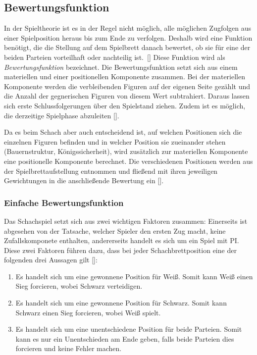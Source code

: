 \subsection{Bewertungsfunktion}

In der Spieltheorie ist es in der Regel nicht möglich, alle möglichen Zugfolgen aus einer Spielposition heraus bis zum Ende zu verfolgen.
Deshalb \glqq [...] wird eine Funktion benötigt, die die Stellung auf dem Spielbrett danach bewertet,
ob sie für eine der beiden Parteien vorteilhaft oder nachteilig ist.\grqq \ [\cite{Paulsen2009}]
Diese Funktion wird als \textit{Bewertungsfunktion} bezeichnet.
Die Bewertungsfunktion setzt sich aus einem materiellen und einer positionellen Komponente zusammen.
Bei der materiellen Komponente werden die verbleibenden Figuren auf der eigenen Seite gezählt und die Anzahl der gegnerischen Figuren von diesem Wert subtrahiert.
Daraus lassen sich erste Schlussfolgerungen über den Spielstand ziehen.
Zudem ist es möglich, die derzeitige Spielphase abzuleiten [\cite{Paulsen2009}].

Da es beim Schach aber auch entscheidend ist, auf welchen Positionen sich die einzelnen Figuren befinden und in welcher Position sie zueinander stehen (Bauernstruktur, Königssicherheit), wird zusätzlich zur materiellen Komponente eine positionelle Komponente berechnet.
Die verschiedenen Positionen werden aus der Spielbrettaufstellung entnommen und fließend mit ihren jeweiligen Gewichtungen in die anschließende Bewertung ein [\cite{Paulsen2009}].


\subsubsection{Einfache Bewertungsfunktion}

Das Schachspiel setzt sich aus zwei wichtigen Faktoren zusammen: Einerseits ist abgesehen von der Tatsache, welcher Spieler den ersten Zug macht, keine Zufallskomponete enthalten, andererseits handelt es sich um ein Spiel mit \gls{PI}.
Diese zwei Faktoren führen dazu, dass bei jeder Schachbrettposition eine der folgenden drei Aussagen gilt [\cite{Shannon1950}]:

\begin{enumerate}
    \item Es handelt sich um eine gewonnene Position für Weiß. Somit kann Weiß einen Sieg forcieren, wobei Schwarz verteidigen.
    \item Es handelt sich um eine gewonnene Position für Schwarz. Somit kann Schwarz einen Sieg forcieren, wobei Weiß spielt.
    \item Es handelt sich um eine unentschiedene Position für beide Parteien. Somit kann es nur ein Unentschieden am Ende geben, falls beide Parteien dies forcieren und keine Fehler machen.
\end{enumerate}

